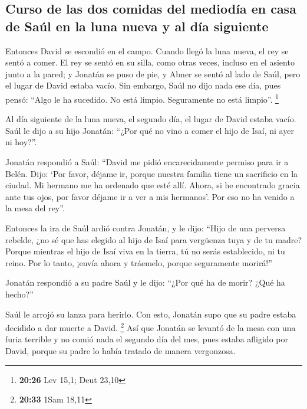 \hypertarget{curso-de-las-dos-comidas-del-medioduxeda-en-casa-de-sauxfal-en-la-luna-nueva-y-al-duxeda-siguiente}{%
\subsection{Curso de las dos comidas del mediodía en casa de Saúl en la
luna nueva y al día
siguiente}\label{curso-de-las-dos-comidas-del-medioduxeda-en-casa-de-sauxfal-en-la-luna-nueva-y-al-duxeda-siguiente}}

 Entonces David se escondió en el campo. Cuando llegó la
luna nueva, el rey se sentó a comer.  El rey se sentó en
su silla, como otras veces, incluso en el asiento junto a la pared; y
Jonatán se puso de pie, y Abner se sentó al lado de Saúl, pero el lugar
de David estaba vacío.  Sin embargo, Saúl no dijo nada
ese día, pues pensó: ``Algo le ha sucedido. No está limpio. Seguramente
no está limpio''. \footnote{\textbf{20:26} Lev 15,1; Deut 23,10}

 Al día siguiente de la luna nueva, el segundo día, el
lugar de David estaba vacío. Saúl le dijo a su hijo Jonatán: ``¿Por qué
no vino a comer el hijo de Isaí, ni ayer ni hoy?''.

 Jonatán respondió a Saúl: ``David me pidió
encarecidamente permiso para ir a Belén.  Dijo: `Por
favor, déjame ir, porque nuestra familia tiene un sacrificio en la
ciudad. Mi hermano me ha ordenado que esté allí. Ahora, si he encontrado
gracia ante tus ojos, por favor déjame ir a ver a mis hermanos'. Por eso
no ha venido a la mesa del rey''.

 Entonces la ira de Saúl ardió contra Jonatán, y le dijo:
``Hijo de una perversa rebelde, ¿no sé que has elegido al hijo de Isaí
para vergüenza tuya y de tu madre?  Porque mientras el
hijo de Isaí viva en la tierra, tú no serás establecido, ni tu reino.
Por lo tanto, ¡envía ahora y tráemelo, porque seguramente morirá!''

 Jonatán respondió a su padre Saúl y le dijo: ``¿Por qué
ha de morir? ¿Qué ha hecho?''

 Saúl le arrojó su lanza para herirlo. Con esto, Jonatán
supo que su padre estaba decidido a dar muerte a David. \footnote{\textbf{20:33}
  1Sam 18,11}  Así que Jonatán se levantó de la mesa con
una furia terrible y no comió nada el segundo día del mes, pues estaba
afligido por David, porque su padre lo había tratado de manera
vergonzosa.

